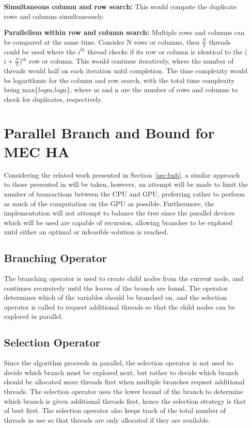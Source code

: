 \documentclass[10pt,twocolumn]{article}
\begin{document}
\textbf{Simultaneous column and row search:} This would compute the duplicate rows and columns simultaneously.

\textbf{Parallelism within row and column search:}
Multiple rows and columns can be compared at the same time. Consider N rows or columns, then $\frac{N}{2}$
threads could be used where the $i^{th}$ thread checks if its row or column is identical to the ($i +
\frac{N}{2}$)$^{th}$ row or column. This would continue iteratively, where the number of threads would half on
each iteration until completion. The time complexity would be logarithmic for the column and row search, with
the total time complexity being max\{$log$m,$log$n\}, where m and n are the number of rows and columns to
check for duplicates, respectively.

\section{ Parallel Branch and Bound for MEC HA } \label{sec:parbnb}

Considering the related work presented in Section~\ref{sec:bnb}, a similar approach to those presented in
\cite{melab:2012, chakroun:2012, chakroun:2013} will be taken, however, an attempt will be made to limit the
number of transactions between the CPU and GPU, preferring rather to perform as much of the computation on the GPU
as possible. Furthermore, the implementation will not attempt to balance the tree since the parallel devices
which will be used are capable of recursion, allowing branches to be explored until either an optimal or
infeasible solution is reached.

\subsection{Branching Operator}

The branching operator is used to create child nodes from the current node, and continues recursively until
the leaves of the branch are found. The operator determines which of the variables should be branched 
on, and the selection operator is called to request additional threads so that the child nodes can be explored in
parallel.

\subsection{Selection Operator}

Since the algorithm proceeds in parallel, the selection operator is not used to decide which branch must be
explored next, but rather to decide which branch should be allocated more threads first when multiple branches
request additional threads. The selection operator uses the lower bound of the branch to determine which
branch is given additional threads first, hence the selection strategy is that of best first. The selection
operator also keeps track of the total number of threads in use so that threads are only allocated if they are
available.
\end{document}
